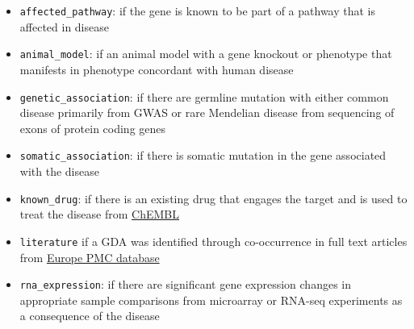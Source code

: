 \begin{itemize}
    \item \texttt{affected\_pathway}: if the gene is known to be part of a pathway that is affected in disease

    \item \texttt{animal\_model}: if an animal model with a gene knockout or phenotype that manifests in phenotype concordant with human disease
    
    \item \texttt{genetic\_association}: if there are germline mutation with either common disease primarily from GWAS or rare Mendelian disease from sequencing of exons of protein coding genes
    
    \item \texttt{somatic\_association}: if there is somatic mutation in the gene associated with the disease
    
    \item \texttt{known\_drug}: if there is an existing drug that engages the target and is used to treat the disease from \href{https://goo.gl/tJ2wzt}{ChEMBL}
    
    \item \texttt{literature} if a GDA was identified through co-occurrence in full text articles from \href{https://europepmc.org/}{Europe PMC database} \cite{koscielny2016}
    
    \item \texttt{rna\_expression}: if there are significant gene expression changes in appropriate sample comparisons from microarray or RNA-seq experiments as a consequence of the disease
\end{itemize}

